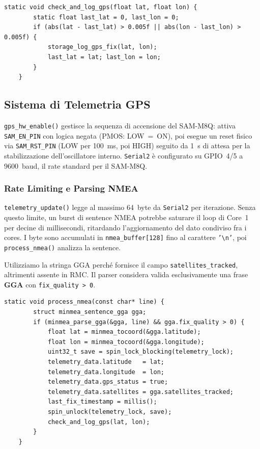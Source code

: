 \begin{lstlisting}[caption={telemetry.cpp --- filtro sul log GPS}]
	static void check_and_log_gps(float lat, float lon) {
		static float last_lat = 0, last_lon = 0;
		if (abs(lat - last_lat) > 0.005f || abs(lon - last_lon) > 0.005f) {
			storage_log_gps_fix(lat, lon);
			last_lat = lat; last_lon = lon;
		}
	}
\end{lstlisting}




\subsection{Sistema di Telemetria GPS}

\texttt{gps\_hw\_enable()} gestisce la sequenza di accensione del SAM-M8Q:
attiva \texttt{SAM\_EN\_PIN} con logica negata (PMOS: LOW~=~ON), poi esegue
un reset fisico via \texttt{SAM\_RST\_PIN} (LOW per 100~ms, poi HIGH) seguito
da 1~s di attesa per la stabilizzazione dell'oscillatore interno. \texttt{Serial2} è configurato su GPIO~4/5
a 9600~baud, il rate standard per il SAM-M8Q.

\subsubsection*{Rate Limiting e Parsing NMEA}

\texttt{telemetry\_update()} legge al massimo 64~byte da \texttt{Serial2} per
iterazione. Senza questo limite, un burst di sentence NMEA potrebbe saturare
il loop di Core~1 per decine di millisecondi, ritardando l'aggiornamento del
dato condiviso fra i cores. I byte sono accumulati in \texttt{nmea\_buffer[128]} fino al
carattere \texttt{'\textbackslash n'}, poi \texttt{process\_nmea()} analizza
la sentence.

Utilizziamo la stringa GGA perché fornisce il campo \texttt{satellites\_tracked}, altrimenti assente in RMC.
Il parser considera valida esclusivamente una frase \textbf{GGA} con
\texttt{fix\_quality > 0}.



\begin{lstlisting}[caption={telemetry.cpp --- validazione fix GGA}]
	static void process_nmea(const char* line) {
		struct minmea_sentence_gga gga;
		if (minmea_parse_gga(&gga, line) && gga.fix_quality > 0) {
			float lat = minmea_tocoord(&gga.latitude);
			float lon = minmea_tocoord(&gga.longitude);
			uint32_t save = spin_lock_blocking(telemetry_lock);
			telemetry_data.latitude   = lat;
			telemetry_data.longitude  = lon;
			telemetry_data.gps_status = true;
			telemetry_data.satellites = gga.satellites_tracked;
			last_fix_timestamp = millis();
			spin_unlock(telemetry_lock, save);
			check_and_log_gps(lat, lon);
		}
	}
\end{lstlisting}

